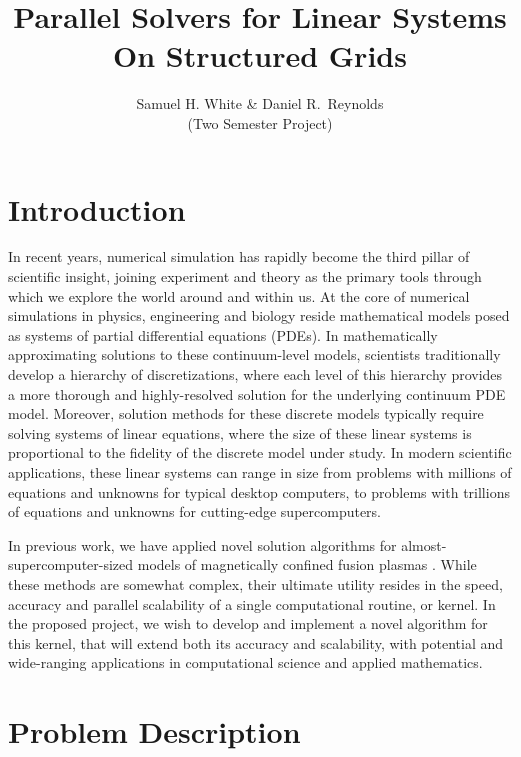 \documentclass[final]{siamltex}
\title{Parallel Solvers for Linear Systems On Structured Grids}
\author{Samuel H. White \& Daniel R.~Reynolds\\
  (Two Semester Project)
}
\renewcommand{\(}{\left(}
\renewcommand{\)}{\right)}
\begin{document}
\maketitle

\pagestyle{myheadings}
\thispagestyle{plain}


\section{Introduction}
\label{sec:intro}

In recent years, numerical simulation has rapidly become the third
pillar of scientific insight, joining experiment and theory as the
primary tools through which we explore the world around and within us.
At the core of numerical simulations in physics, engineering and 
biology reside mathematical models posed as systems of partial
differential equations (PDEs).  In mathematically approximating
solutions to these continuum-level models, scientists traditionally
develop a hierarchy of discretizations, where each level of this
hierarchy provides a more thorough and highly-resolved solution for
the underlying continuum PDE model.  Moreover, solution methods for
these discrete models typically require solving systems of
linear equations, where the size of these linear systems is
proportional to the fidelity of the discrete model under study.  In
modern scientific applications, these linear systems can range in size
from problems with millions of equations and unknowns for typical
desktop computers, to problems with trillions of equations and
unknowns for cutting-edge supercomputers.

In previous work, we have applied novel solution algorithms for
almost-supercomputer-sized models of magnetically confined fusion
plasmas \cite{ReynoldsSamtaneyWoodward2006,ReynoldsSamtaneyWoodward2010}.
While these methods are somewhat complex, their ultimate utility
resides in the speed, accuracy and parallel scalability
of a single computational routine, or kernel.  In
the proposed project, we wish to develop and implement a novel
algorithm for this kernel, that will extend both its accuracy and
scalability, with potential and wide-ranging applications in
computational science and applied mathematics.



\section{Problem Description}
\label{sec:problem}
\end{document}
